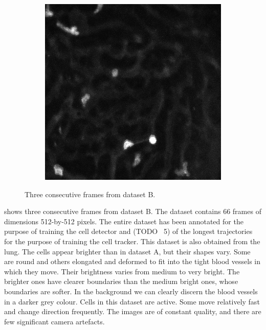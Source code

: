\begin{figure}[h]
\begin{subfigure}{.32\textwidth}
		\end{subfigure}
		\hfill
		\begin{subfigure}{.32\textwidth}
		\includegraphics[width=\textwidth]{images/series30red025}
		\end{subfigure}
		\caption{Three consecutive frames from dataset B.}
		\label{fig:data_datasetB}
	\end{figure}
		
	 shows three consecutive frames from dataset B. The dataset contains 66 frames of dimensions 512-by-512 pixels. The entire dataset has been annotated for the purpose of training the cell detector and (TODO ~5) of the longest trajectories for the purpose of training the cell tracker. This dataset is also obtained from the lung. The cells appear brighter than in dataset A, but their shapes vary. Some are round and others elongated and deformed to fit into the tight blood vessels  in which they move. Their brightness varies from medium to very bright. The brighter ones have clearer boundaries than the medium bright ones, whose boundaries are softer. In the background we can clearly discern the blood vessels in a darker grey colour. Cells in this dataset are active. Some move relatively fast and change direction frequently. The images are of constant quality, and there are few significant camera artefacts.
		
